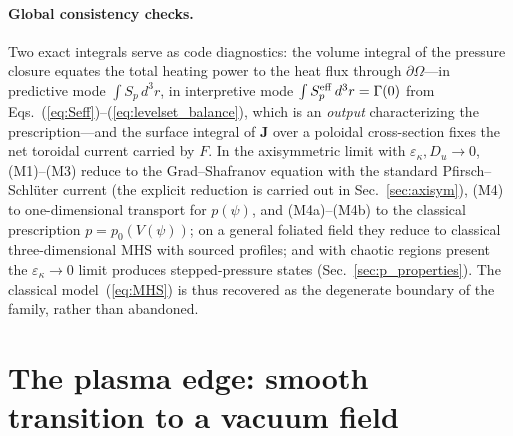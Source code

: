 \documentclass[english]{article}
\newcommand{\bJ}{\mathbf{J}}
\begin{document}
\paragraph{Global consistency checks.}
Two exact integrals serve as code diagnostics: the volume integral of the pressure closure equates
the total heating power to the heat flux through $\partial\Omega$---in predictive mode
$\int S_p\,d^3r$, in interpretive mode $\int S_p^{\rm eff}\,d^3r=\Gamma(0)$ from
Eqs.~(\ref{eq:Seff})--(\ref{eq:levelset_balance}), which is an \emph{output} characterizing the
prescription---and the surface integral of
$\bJ$ over a poloidal cross-section fixes the net toroidal current carried by $F$. In the
axisymmetric limit with $\varepsilon_\kappa,D_u\rightarrow0$, (M1)--(M3) reduce to the
Grad--Shafranov equation with the standard Pfirsch--Schl\"uter current
(the explicit reduction is carried out in Sec.~\ref{sec:axisym}), (M4) to
one-dimensional transport for $p(\psi)$, and (M4a)--(M4b) to the classical prescription
$p=p_0(V(\psi))$; on a general foliated field they reduce to classical
three-dimensional MHS with sourced profiles; and with chaotic regions present the
$\varepsilon_\kappa\rightarrow0$ limit produces stepped-pressure states
(Sec.~\ref{sec:p_properties}). The classical model~(\ref{eq:MHS}) is thus recovered as the
degenerate boundary of the family, rather than abandoned.

\section{The plasma edge: smooth transition to a vacuum field}
\label{sec:edge}
\end{document}
